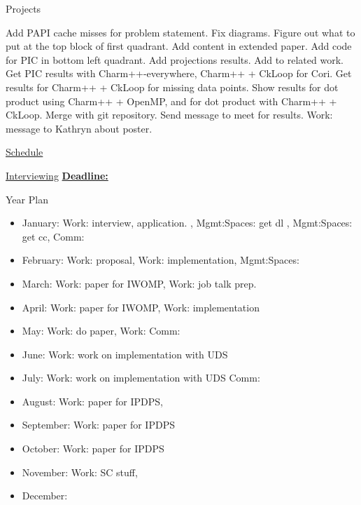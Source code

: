 \begin{columns}
\begin{column}{0.10\linewidth}
\begin{block}{Projects}
\begin{enumerate}
\ptask Add PAPI cache misses for problem statement.
\ptask Fix diagrams.
\ptask Figure out what to put at the top block of first quadrant.
\ptask Add content in extended paper.
\ptask Add code for PIC in bottom left quadrant.
\ptask Add projections results.
\ptask Add to related work.
\ptask Get PIC results with Charm++-everywhere, Charm++ + CkLoop for Cori.
\ptask Get results for Charm++ + CkLoop for missing data points.
\ptask Show results for dot product using Charm++ + OpenMP, and for
dot product with Charm++ + CkLoop.
\pitem Merge with git repository.
\pitem Send message to meet for results.
\pitem Work: message to Kathryn about poster.
\end{enumerate}

\underline{Schedule} \\ 
\begin{enumerate}
\pitem 
\end{enumerate} 
\end{block} 

\underline{Interviewing} 
\underline{\textbf{Deadline:}} 
\begin{enumerate}
\pitem 
\pitem 
\end{enumerate} 



\begin{block}{Year Plan}
\begin{itemize}
\tiny \item \tiny January: Work: interview, application. , Mgmt:Spaces: get dl , Mgmt:Spaces: get cc, Comm: 
\item \tiny February: Work: proposal, Work: implementation, Mgmt:Spaces: 
\item \tiny March: Work: paper for IWOMP, Work: job talk prep.
\item \tiny April: Work: paper for IWOMP, Work: implementation  
\item \tiny May: Work: do paper, Work: Comm: 
\item \tiny June: Work: work on implementation with UDS 
\item \tiny July: Work: work on implementation with UDS Comm:  
\item \tiny August: Work: paper for IPDPS, 
\item \tiny September: Work: paper for IPDPS 
\item \tiny October: Work: paper for IPDPS  
\item \tiny November: Work: SC stuff, 
\item \tiny December: 
\end{itemize} 
\end{block}


\end{column}
\end{columns}
